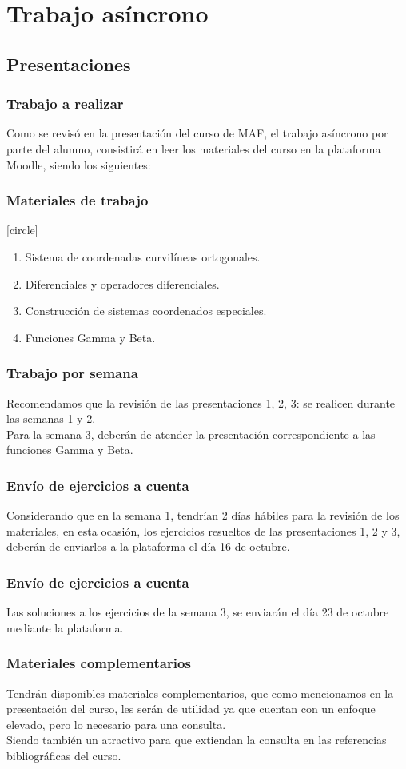 \section{Trabajo asíncrono}
\subsection{Presentaciones}
\begin{frame}
\frametitle{Trabajo a realizar}
Como se revisó en la presentación del curso de MAF, el trabajo asíncrono por parte del alumno, consistirá en leer los materiales del curso en la plataforma Moodle, siendo los siguientes:
\end{frame}
\begin{frame}
\frametitle{Materiales de trabajo}
[circle]
\begin{enumerate}[<+->]
\item Sistema de coordenadas curvilíneas ortogonales.
\item Diferenciales y operadores diferenciales.
\item Construcción de sistemas coordenados especiales.
\item Funciones Gamma y Beta.
\end{enumerate}
\end{frame}
\begin{frame}
\frametitle{Trabajo por semana}
Recomendamos que la revisión de las presentaciones 1, 2, 3: se realicen durante las semanas 1 y 2.
\\
\bigskip
Para la semana 3, deberán de atender la presentación correspondiente a las funciones Gamma y Beta.
\end{frame}
\begin{frame}
\frametitle{Envío de ejercicios a cuenta}
Considerando que en la semana 1, tendrían 2 días hábiles para la revisión de los materiales, en esta ocasión, los ejercicios resueltos de las presentaciones 1, 2 y 3, deberán de enviarlos a la plataforma el día 16 de octubre.
\end{frame}
\begin{frame}
\frametitle{Envío de ejercicios a cuenta}
Las soluciones a los ejercicios de la semana 3, se enviarán el día 23 de octubre mediante la plataforma.
\end{frame}
\begin{frame}
\frametitle{Materiales complementarios}
Tendrán disponibles materiales complementarios, que como mencionamos en la presentación del curso, les serán de utilidad ya que cuentan con un enfoque elevado, pero lo necesario para una consulta.
\\
\bigskip
Siendo también un atractivo para que extiendan la consulta en las referencias bibliográficas del curso.
\end{frame}
